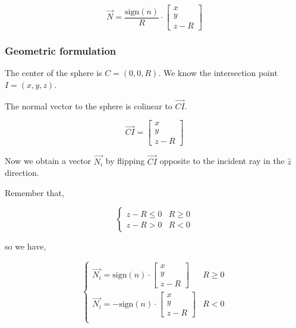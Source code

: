 \begin{equation} \label{eq:sphere-normal-anaformula}
\overrightarrow{N} = \frac{\textrm{sign}(n)}{R} \cdot
\begin{bmatrix}
x \\ y \\ z - R
\end{bmatrix}
\end{equation}

\subsubsection{Geometric formulation}
The center of the sphere is $C = (0, 0, R)$. We know the intersection point
$I = (x, y, z)$.

The normal vector to the sphere is colinear to $\overrightarrow{CI}$.

\begin{equation}
\overrightarrow{CI} = \begin{bmatrix} x \\ y \\ z - R \end{bmatrix}
\end{equation}

Now we obtain a vector $\overrightarrow{N_i}$ by flipping $\overrightarrow{CI}$
opposite to the incident ray in the $\hat{z}$ direction.

Remember that,

\begin{equation} \begin{cases}
z - R \leq 0 & R \geq 0 \\
z - R > 0 & R < 0
\end{cases} \end{equation}

so we have,

\begin{equation} \begin{cases}
\overrightarrow{N_i} = \textrm{sign}(n) \cdot
\begin{bmatrix} x \\ y \\ z - R \end{bmatrix} & R \geq 0 \\
\overrightarrow{N_i} = - \textrm{sign}(n) \cdot
\begin{bmatrix} x \\ y \\ z - R \end{bmatrix} & R < 0 \\
\end{cases} \end{equation}

